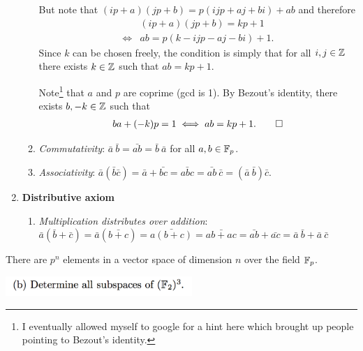 \documentclass[12pt]{article}
\begin{document}
\begin{mdframed}
\begin{enumerate}
\begin{enumerate}
      But note that $(ip + a)(jp + b) = p(ijp + aj + bi) + ab$ and therefore
      \begin{align*}
        &(ip + a)(jp + b) = kp + 1\\
        \iff &ab = p(k - ijp - aj - bi) + 1.
      \end{align*}
      Since $k$ can be chosen freely, the condition is simply that for all
      $i, j \in \mathbb{Z}$ there exists $k \in \mathbb{Z}$ such that $ab = kp + 1$.

      Note\footnote{I eventually allowed myself to google for a hint here which
        brought up people pointing to Bezout's identity.} that $a$ and $p$ are
      coprime (gcd is 1). By Bezout's identity, there exists $b, -k \in \mathbb{Z}$
      such that
      \begin{align*}
        ba + (-k)p = 1 \iff ab = kp + 1. \qed
      \end{align*}


    \item \textit{Commutativity}:
      $\bar a ~ \bar b = \bar{ab} = \bar{b} ~ \bar{a}$ for all $a, b \in \mathbb{F}_p$.
    \item \textit{Associativity}:
      $\bar a (\bar b \bar c) = \bar a + \bar {bc} = \bar{abc} =
      \bar{ab}~\bar{c} = (\bar a ~ \bar b) \bar{c}$.
    \end{enumerate}
  \item \textbf{Distributive axiom}
    \begin{enumerate}
    \item \textit{Multiplication distributes over addition}: $\bar a (\bar b + \bar c) = \bar a (\bar{b + c}) = \bar{a(b+c)} = \bar{ab +
      ac} = \bar{ab} + \bar{ac} = \bar{a}~\bar{b} + \bar{a}~\bar{c}$
    \end{enumerate}
  \end{enumerate}

There are $p^n$ elements in a vector space of dimension $n$ over the field $\mathbb{F}_p$.
\end{mdframed}
\includegraphics[width=200pt]{img/linear-algebra-a0-1-1-b.png}
\end{document}
